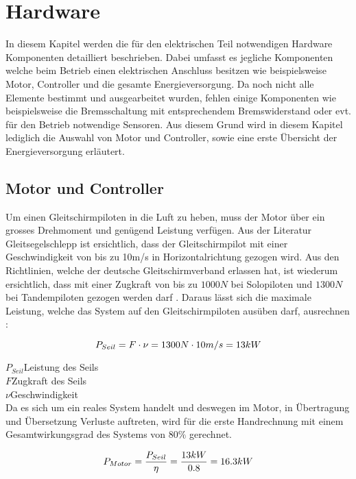 \section{Hardware}\label{sec:Hardware}
In diesem Kapitel werden die für den elektrischen Teil notwendigen Hardware Komponenten detailliert beschrieben. Dabei umfasst es jegliche Komponenten welche beim Betrieb einen elektrischen Anschluss besitzen wie beispielsweise Motor, Controller und die gesamte Energieversorgung. Da noch nicht alle Elemente bestimmt und ausgearbeitet wurden, fehlen einige Komponenten wie beispielsweise die Bremsschaltung mit entsprechendem Bremswiderstand oder evt. für den Betrieb notwendige Sensoren. Aus diesem Grund wird in diesem Kapitel lediglich die Auswahl von Motor und Controller, sowie eine erste Übersicht der Energieversorgung erläutert.


\subsection{Motor und Controller}\label{subsec:MotorController}
Um einen Gleitschirmpiloten in die Luft zu heben, muss der Motor über ein grosses Drehmoment und genügend Leistung verfügen. Aus der Literatur Gleitsegelschlepp \cite{Gleitsegelschlepp} ist ersichtlich, dass der Gleitschirmpilot mit einer Geschwindigkeit von bis zu 10m/s in Horizontalrichtung gezogen wird. Aus den Richtlinien, welche der deutsche Gleitschirmverband erlassen hat, ist wiederum ersichtlich, dass mit einer Zugkraft von bis zu $ 1000N $ bei Solopiloten und $ 1300N $ bei Tandempiloten gezogen werden darf \cite{WindenProtokoll}. Daraus lässt sich die maximale Leistung, welche das System auf den Gleitschirmpiloten ausüben darf, ausrechnen \cite{Kuchling}:


\begin{equation}
\centering
	P_{Seil}=F \cdot \nu=1300N \cdot 10m/s=13kW
\label{eq:LeistungSeil}
\end{equation}

$ P_{Seil} $\quad 	Leistung des Seils     \\
$ F $\qquad  Zugkraft des Seils    \\
$ \nu $\qquad  Geschwindigkeit     \\

Da es sich um ein reales System handelt und deswegen im Motor, in Übertragung und Übersetzung Verluste auftreten, wird für die erste Handrechnung mit einem Gesamtwirkungsgrad des Systems von $80\%$ gerechnet.

\begin{equation}
\centering
	P_{Motor}=\frac{P_{Seil}}{\eta}=\frac{13kW}{0.8}=16.3kW
\label{eq:LeistungMotor}
\end{equation}

